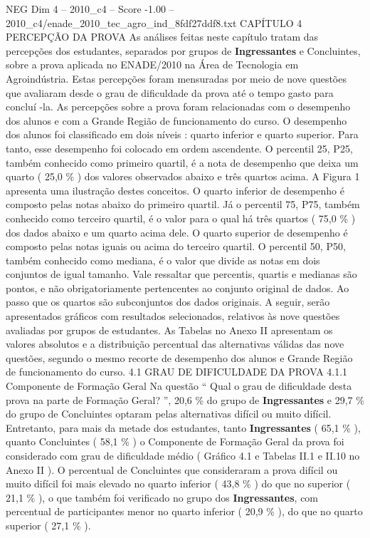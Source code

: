 \begin{textsample}{NEG Dim 4 – 2010\_c4 – Score -1.00 – 2010\_c4/enade\_2010\_tec\_agro\_ind\_8fdf27ddf8.txt}  \label{ex:f4_neg_070}
CAPÍTULO 4 PERCEPÇÃO DA PROVA As análises feitas neste capítulo tratam das percepções dos estudantes, separados por grupos de \textbf{Ingressantes} e Concluintes, sobre a prova aplicada no ENADE/2010 na Área de Tecnologia em Agroindústria.
Estas percepções foram mensuradas por meio de nove questões que avaliaram desde o grau de dificuldade da prova até o tempo gasto para concluí -la.
As percepções sobre a prova foram relacionadas com o desempenho dos alunos e com a Grande Região de funcionamento do curso.
O desempenho dos alunos foi classificado em dois níveis : quarto inferior e quarto superior.
Para tanto, esse desempenho foi colocado em ordem ascendente.
O percentil 25, P25, também conhecido como primeiro quartil, é a nota de desempenho que deixa um quarto ( 25,0 \% ) dos valores observados abaixo e três quartos acima.
A Figura 1 apresenta uma ilustração destes conceitos.
O quarto inferior de desempenho é composto pelas notas abaixo do primeiro quartil.
Já o percentil 75, P75, também conhecido como terceiro quartil, é o valor para o qual há três quartos ( 75,0 \% ) dos dados abaixo e um quarto acima dele.
O quarto superior de desempenho é composto pelas notas iguais ou acima do terceiro quartil.
O percentil 50, P50, também conhecido como mediana, é o valor que divide as notas em dois conjuntos de igual tamanho.
Vale ressaltar que percentis, quartis e medianas são pontos, e não obrigatoriamente pertencentes ao conjunto original de dados.
Ao passo que os quartos são subconjuntos dos dados originais.
A seguir, serão apresentados gráficos com resultados selecionados, relativos às nove questões avaliadas por grupos de estudantes.
As Tabelas no Anexo II apresentam os valores absolutos e a distribuição percentual das alternativas válidas das nove questões, segundo o mesmo recorte de desempenho dos alunos e Grande Região de funcionamento do curso. 4.1 GRAU DE DIFICULDADE DA PROVA 4.1.1 Componente de Formação Geral Na questão “ Qual o grau de dificuldade desta prova na parte de Formação Geral? ”, 20,6 \% do grupo de \textbf{Ingressantes} e 29,7 \% do grupo de Concluintes optaram pelas alternativas difícil ou muito difícil.
Entretanto, para mais da metade dos estudantes, tanto \textbf{Ingressantes} ( 65,1 \% ), quanto Concluintes ( 58,1 \% ) o Componente de Formação Geral da prova foi considerado com grau de dificuldade médio ( Gráfico 4.1 e Tabelas II.1 e II.10 no Anexo II ).
O percentual de Concluintes que consideraram a prova difícil ou muito difícil foi mais elevado no quarto inferior ( 43,8 \% ) do que no superior ( 21,1 \% ), o que também foi verificado no grupo dos \textbf{Ingressantes}, com percentual de participantes menor no quarto inferior ( 20,9 \% ), do que no quarto superior ( 27,1 \% ).

\end{textsample}
